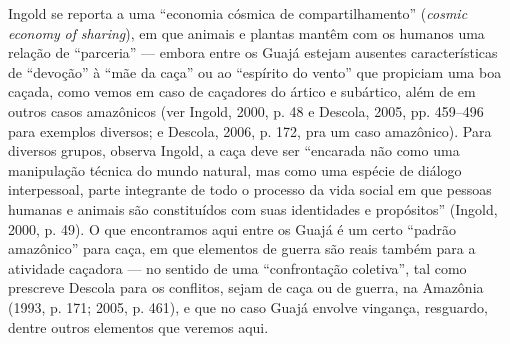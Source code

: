 Ingold se reporta a uma ``economia cósmica de compartilhamento''
(\emph{cosmic} \emph{economy} \emph{of} \emph{sharing}), em que animais
e plantas mantêm com os humanos uma relação de ``parceria'' --- embora entre
os Guajá estejam ausentes características de ``devoção'' à ``mãe da caça''
ou ao ``espírito do vento'' que propiciam uma boa caçada, como vemos em
caso de caçadores do ártico e subártico, além de em outros casos
amazônicos (ver Ingold, 2000, p. 48 e Descola, 2005, pp. 459--496 para
exemplos diversos; e Descola, 2006, p. 172, pra um caso amazônico). Para
diversos grupos, observa Ingold, a caça deve ser ``encarada não como uma
manipulação técnica do mundo natural, mas como uma espécie de diálogo
interpessoal, parte integrante de todo o processo da vida social em que
pessoas humanas e animais são constituídos com suas identidades e
propósitos'' (Ingold, 2000, p. 49). O que encontramos aqui entre os Guajá
é um certo ``padrão amazônico'' para caça, em que elementos de guerra são
reais também para a atividade caçadora --- no sentido de uma ``confrontação
coletiva'', tal como prescreve Descola para os conflitos, sejam de caça
ou de guerra, na Amazônia (1993, p. 171; 2005, p. 461), e que no caso
Guajá envolve vingança, resguardo, dentre outros elementos que veremos
aqui.

